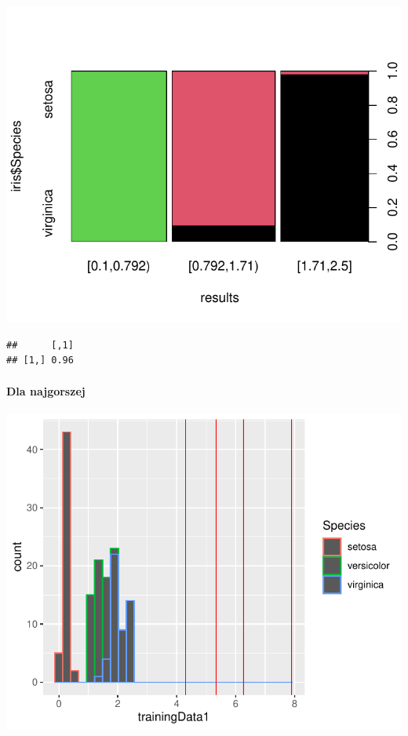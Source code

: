 \documentclass[
  12pt,
]{article}
\begin{document}
\begin{center}\includegraphics{Sprawozdanie2_files/figure-latex/tabela_kondygnacji_3_najl-1} \end{center}

\begin{verbatim}
##      [,1]
## [1,] 0.96
\end{verbatim}

\paragraph{Dla najgorszej}\label{dla-najgorszej-2}

\begin{center}\includegraphics{Sprawozdanie2_files/figure-latex/kMeans_najg-1} \end{center}
\end{document}
